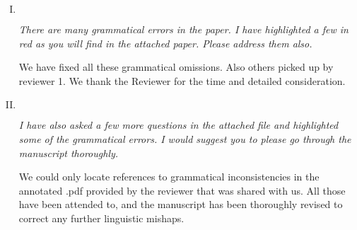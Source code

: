 \documentclass[11pt]{article}
\newenvironment{reviewer}
{\begin{mdframed}[roundcorner = 10pt,fontcolor=blue!70!black]\itshape}
{\end{mdframed}}
\begin{document}
\begin{enumerate}[I.]
  
  \item $ $
  \begin{reviewer}
  There are many grammatical errors in the paper. I have highlighted a few in red as you will find in the attached paper. Please address them also.
   \end{reviewer}
  \noindent We have fixed all these grammatical omissions. Also others picked up by reviewer 1. We thank the Reviewer for the time and detailed consideration.
  
  \item $ $
  \begin{reviewer}
  I have also asked a few more questions in the attached file and highlighted some of the grammatical errors. I would suggest you to please go through the manuscript thoroughly.
   \end{reviewer}
  \noindent We could only locate references to grammatical inconsistencies in the annotated .pdf provided by the reviewer that was shared with us. All those have been attended to, and the manuscript has been thoroughly revised to correct any further linguistic mishaps.

\end{enumerate}
\end{document}
